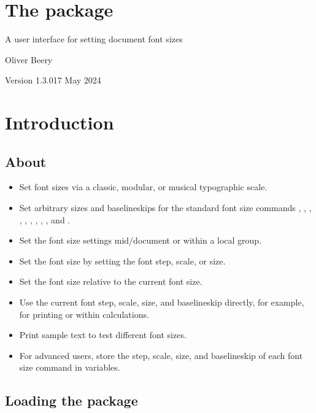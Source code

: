 \documentclass{beery}
\begin{document}
\section*
  {%
    The  package%
  }

A user interface for setting document font sizes

Oliver Beery

Version 1.3.0\quad{}17 May 2024


\section{Introduction}
\label{sec:intro}

\subsection{About}
\label{subsec:about}

\begin{itemize}
  \item
  Set font sizes via a classic, modular, or musical typographic scale.
  \item
  Set arbitrary sizes and baselineskips for the standard font size commands , , , , , , , , , and .
  \item
  Set the font size settings mid\-/document or within a local group.
  \item
  Set the font size by setting the font step, scale, or size.
  \item
  Set the font size relative to the current font size.
  \item
  Use the current font step, scale, size, and baselineskip directly, for example, for printing or within calculations.
  \item
  Print sample text to test different font sizes.
  \item
  For advanced users, store the step, scale, size, and baselineskip of each font size command in  variables.
\end{itemize}

\subsection{Loading the package}
\label{subsec:loading}
\end{document}
